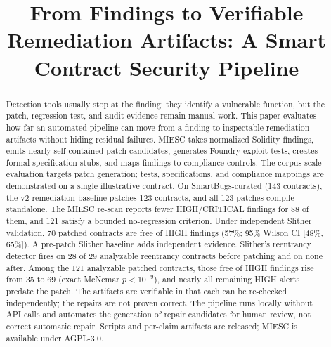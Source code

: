 \documentclass[conference]{IEEEtran}
\begin{document}
\title{From Findings to Verifiable Remediation Artifacts: A Smart Contract Security Pipeline}

\author{
}

\maketitle

\begin{abstract}
Detection tools usually stop at the finding: they identify a vulnerable function, but the patch, regression test, and audit evidence remain manual work. This paper evaluates how far an automated pipeline can move from a finding to inspectable remediation artifacts without hiding residual failures. MIESC takes normalized Solidity findings, emits nearly self-contained patch candidates, generates Foundry exploit tests, creates formal-specification stubs, and maps findings to compliance controls. The corpus-scale evaluation targets patch generation; tests, specifications, and compliance mappings are demonstrated on a single illustrative contract. On SmartBugs-curated (143 contracts), the v2 remediation baseline patches 123 contracts, and all 123 patches compile standalone. The MIESC re-scan reports fewer HIGH/CRITICAL findings for 88 of them, and 121 satisfy a bounded no-regression criterion. Under independent Slither validation, 70 patched contracts are free of HIGH findings (57\%; 95\% Wilson CI [48\%, 65\%]). A pre-patch Slither baseline adds independent evidence. Slither's reentrancy detector fires on 28 of 29 analyzable reentrancy contracts before patching and on none after. Among the 121 analyzable patched contracts, those free of HIGH findings rise from 35 to 69 (exact McNemar $p<10^{-9}$), and nearly all remaining HIGH alerts predate the patch. The artifacts are verifiable in that each can be re-checked independently; the repairs are not proven correct. The pipeline runs locally without API calls and automates the generation of repair candidates for human review, not correct automatic repair. Scripts and per-claim artifacts are released; MIESC is available under AGPL-3.0.
\end{abstract}
\end{document}
